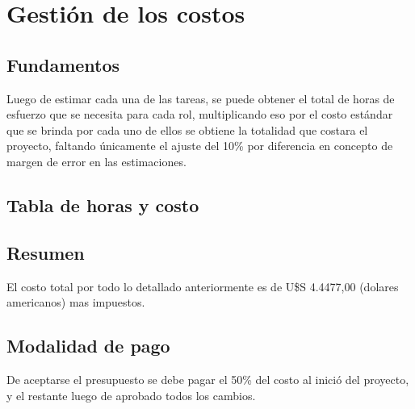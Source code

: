\section{Gestión de los costos}

\subsection{Fundamentos}
Luego de estimar cada una de las tareas, se puede obtener el total de horas de esfuerzo que se necesita para cada rol, multiplicando eso por el costo estándar que se brinda por cada uno de ellos se obtiene la totalidad que costara el proyecto, faltando únicamente el ajuste del 10\% por diferencia en concepto de margen de error en las estimaciones.

\subsection{Tabla de horas y costo}




\subsection{Resumen}

El costo total por todo lo detallado anteriormente es de U\$S 4.4477,00 (dolares americanos) mas impuestos.

\subsection{Modalidad de pago}

De aceptarse el presupuesto se debe pagar el 50\% del costo al inició del proyecto, y el restante luego de aprobado todos los cambios.
